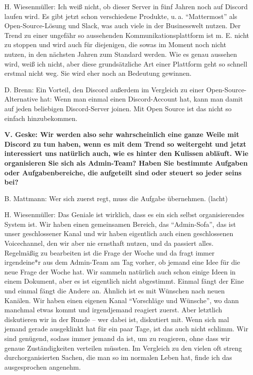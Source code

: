 \documentclass[a4paper,
fontsize=11pt,
oneside,
numbers=noperiodatend,
parskip=half-,
bibliography=totoc,
final
]{scrartcl}
\begin{document}
H. Wiesenmüller: Ich weiß nicht, ob dieser Server in fünf Jahren noch
auf Discord laufen wird. Es gibt jetzt schon verschiedene Produkte,
u. a. \enquote{Mattermost} als Open-Source-Lösung und Slack, was auch viele in
der Businesswelt nutzen. Der Trend zu einer ungefähr so aussehenden
Kommunikationsplattform ist m. E. nicht zu stoppen und wird auch für
diejenigen, die sowas im Moment noch nicht nutzen, in den nächsten
Jahren zum Standard werden. Wie es genau aussehen wird, weiß ich nicht,
aber diese grundsätzliche Art einer Plattform geht so schnell erstmal
nicht weg. Sie wird eher noch an Bedeutung gewinnen.

D. Brenn: Ein Vorteil, den Discord außerdem im Vergleich zu einer
Open-Source-Alternative hat: Wenn man einmal einen Discord-Account hat,
kann man damit auf jeden beliebigen Discord-Server joinen. Mit Open
Source ist das nicht so einfach hinzubekommen.

\textbf{V. Geske: Wir werden also sehr wahrscheinlich eine ganze Weile
mit Discord zu tun haben, wenn es mit dem Trend so weitergeht und jetzt
interessiert uns natürlich auch, wie es hinter den Kulissen abläuft. Wie
organisieren Sie sich als Admin-Team? Haben Sie bestimmte Aufgaben oder
Aufgabenbereiche, die aufgeteilt sind oder steuert so jeder seins bei?}

B. Mattmann: Wer sich zuerst regt, muss die Aufgabe übernehmen. (lacht)

H. Wiesenmüller: Das Geniale ist wirklich, dass es ein sich selbst
organisierendes System ist. Wir haben einen gemeinsamen Bereich, das
\enquote{Admin-Sofa}, das ist unser geschlossener Kanal und wir haben
eigentlich auch einen geschlossenen Voicechannel, den wir aber nie
ernsthaft nutzen, und da passiert alles. Regelmäßig zu bearbeiten ist
die Frage der Woche und da fragt immer irgendeine*r aus dem Admin-Team
am Tag vorher, ob jemand eine Idee für die neue Frage der Woche hat. Wir
sammeln natürlich auch schon einige Ideen in einem Dokument, aber es ist
eigentlich nicht abgestimmt. Einmal fängt der Eine und einmal fängt die
Andere an. Ähnlich ist es mit Wünschen nach neuen Kanälen. Wir haben
einen eigenen Kanal \enquote{Vorschläge und Wünsche}, wo dann manchmal etwas
kommt und irgendjemand reagiert zuerst. Aber letztlich diskutieren wir
in der Runde -- wer dabei ist, diskutiert mit. Wenn sich mal jemand
gerade ausgeklinkt hat für ein paar Tage, ist das auch nicht schlimm.
Wir sind genügend, sodass immer jemand da ist, um zu reagieren, ohne
dass wir genaue Zuständigkeiten verteilen müssten. Im Vergleich zu den
vielen oft streng durchorganisierten Sachen, die man so im normalen
Leben hat, finde ich das ausgesprochen angenehm.
\end{document}
